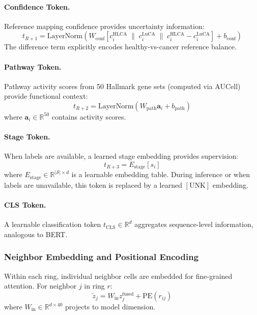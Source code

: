 \paragraph{Confidence Token.} Reference mapping confidence provides uncertainty information:
\begin{equation}
    t_{R+1} = \text{LayerNorm}(W_{\text{conf}} [c_i^{\text{HLCA}} \;\|\; c_i^{\text{LuCA}} \;\|\; c_i^{\text{HLCA}} - c_i^{\text{LuCA}}] + b_{\text{conf}})
\end{equation}
The difference term explicitly encodes healthy-vs-cancer reference balance.

\paragraph{Pathway Token.} Pathway activity scores from 50 Hallmark gene sets (computed via AUCell) provide functional context:
\begin{equation}
    t_{R+2} = \text{LayerNorm}(W_{\text{path}} \mathbf{a}_i + b_{\text{path}})
\end{equation}
where $\mathbf{a}_i \in \mathbb{R}^{50}$ contains activity scores.

\paragraph{Stage Token.} When labels are available, a learned stage embedding provides supervision:
\begin{equation}
    t_{R+3} = E_{\text{stage}}[s_i]
\end{equation}
where $E_{\text{stage}} \in \mathbb{R}^{|\mathcal{S}| \times d}$ is a learnable embedding table. During inference or when labels are unavailable, this token is replaced by a learned $[\text{UNK}]$ embedding.

\paragraph{CLS Token.} A learnable classification token $t_{\text{CLS}} \in \mathbb{R}^d$ aggregates sequence-level information, analogous to BERT.

\subsubsection{Neighbor Embedding and Positional Encoding}

Within each ring, individual neighbor cells are embedded for fine-grained attention. For neighbor $j$ in ring $r$:
\begin{equation}
    \tilde{z}_j = W_{\text{in}} z_j^{\text{fused}} + \text{PE}(r_{ij})
\end{equation}
where $W_{\text{in}} \in \mathbb{R}^{d \times 40}$ projects to model dimension.

